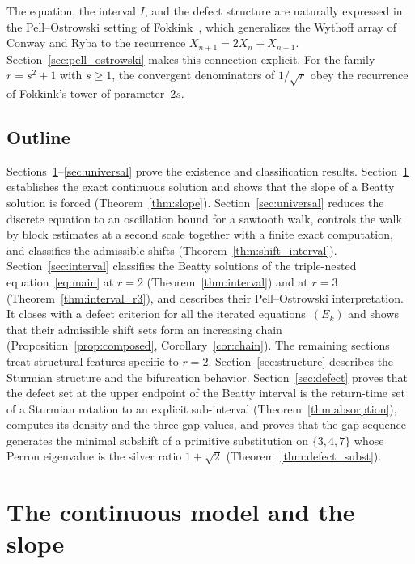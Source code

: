 \documentclass{birkjour}
\theoremstyle{definition}
\theoremstyle{remark}
\begin{document}
The equation, the interval $I$, and the defect
structure are naturally expressed in the
Pell--Ostrowski setting of
Fokkink~\cite{Fokkink}, which generalizes the
Wythoff array of Conway and Ryba to the recurrence
$X_{n+1}=2X_{n}+X_{n-1}$. Section~\ref{sec:pell_ostrowski}
makes this connection explicit. For the family $r=s^{2}+1$
with $s\ge 1$, the convergent denominators of $1/\!\sqrt{r}$
obey the recurrence of Fokkink's tower of parameter~$2s$.

\subsection{Outline}

Sections~\ref{sec:continuous}--\ref{sec:universal}
prove the existence and classification results.
Section~\ref{sec:continuous} establishes the exact
continuous solution and shows that the slope of a Beatty
solution is forced (Theorem~\ref{thm:slope}).
Section~\ref{sec:universal} reduces the discrete
equation to an oscillation bound for a sawtooth
walk, controls the walk by block estimates at a
second scale together with a finite exact computation,
and classifies the admissible shifts
(Theorem~\ref{thm:shift_interval}).
Section~\ref{sec:interval} classifies the Beatty solutions of
the triple-nested equation~\eqref{eq:main} at $r=2$
(Theorem~\ref{thm:interval}) and at $r=3$
(Theorem~\ref{thm:interval_r3}), and describes their
Pell--Ostrowski interpretation. It closes with a defect
criterion for all the iterated equations~$(E_{k})$ and shows
that their admissible shift sets form an increasing chain
(Proposition~\ref{prop:composed}, Corollary~\ref{cor:chain}).
The remaining sections treat structural
features specific to $r=2$.
Section~\ref{sec:structure} describes the Sturmian
structure and the bifurcation behavior.
Section~\ref{sec:defect} proves that the defect
set at the upper endpoint of the Beatty interval
is the return-time set of a Sturmian rotation to
an explicit sub-interval (Theorem~\ref{thm:absorption}),
computes its density and the three gap values, and
proves that the gap sequence generates the minimal
subshift of a primitive substitution on $\{3,4,7\}$
whose Perron eigenvalue is the silver ratio
$1+\sqrt{2}$ (Theorem~\ref{thm:defect_subst}).

\section{The continuous model and the slope}\label{sec:continuous}
\end{document}
